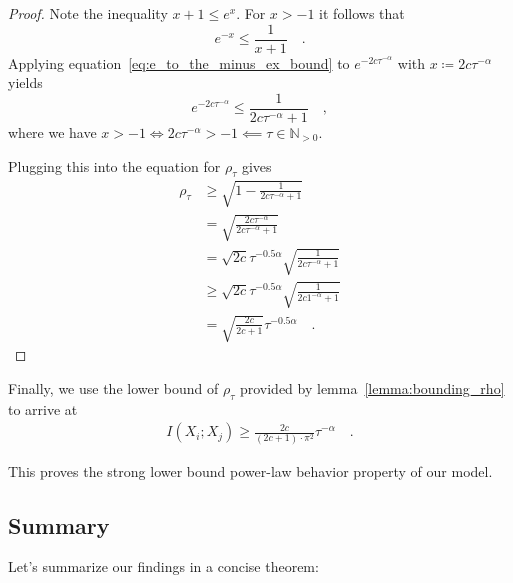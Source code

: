 \documentclass[../../main.tex]{subfiles}
\begin{document}
\begin{proof}
    Note the inequality $x + 1 \leq e^x$. For $x > -1$ it follows that
    \begin{equation}
        e^{-x} \leq \frac{1}{x + 1} \label{eq:e_to_the_minus_ex_bound} \quad .
    \end{equation}
    Applying equation~\ref{eq:e_to_the_minus_ex_bound} to $e^{-2c \tau^{-\alpha}}$ with $x \coloneqq 2c \tau^{-\alpha}$ yields
    \[
        e^{-2c \tau^{-\alpha}} \leq \frac{1}{2c \tau^{-\alpha} + 1} \quad ,
    \]
    where we have $x > -1 \iff 2c \tau^{-\alpha} > -1 \impliedby \tau \in \mathbb{N}_{>0}$.

    Plugging this into the equation for $\rho_\tau$ gives
    \begin{align*}
        \rho_\tau &\geq \sqrt{1 - \frac{1}{2c \tau^{-\alpha} + 1}} \\
        &= \sqrt{\frac{2c \tau^{-\alpha}}{2c \tau^{-\alpha} + 1}} \\
        &= \sqrt{2c} \tau^{-0.5\alpha} \sqrt{\frac{1}{2c \tau^{-\alpha} + 1}} \\
        &\geq \sqrt{2c} \tau^{-0.5\alpha} \sqrt{\frac{1}{2c 1^{-\alpha} + 1}} \\
        &= \sqrt{\frac{2c}{2c + 1}} \tau^{-0.5 \alpha} \quad .
    \end{align*}
\end{proof}

Finally, we use the lower bound of $\rho_\tau$ provided by lemma~\ref{lemma:bounding_rho} to arrive at
\begin{align*}
    I(X_i; X_j) \geq \frac{2c}{(2c + 1) \cdot \pi^2} \tau^{-\alpha} \quad .
\end{align*}

This proves the strong lower bound power-law behavior property of our model.

\pagebreak
\subsection{Summary}
Let's summarize our findings in a concise theorem:
\end{document}
